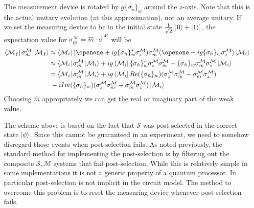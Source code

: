 \documentclass[aps,pra,12pt,onecolumn,showpacs,superscriptaddress,floatfix,footinbib,subfigure]{revtex4}
\def\bra#1{\mathinner{\langle{#1}|}}
\def\ket#1{\mathinner{|{#1}\rangle}}
\def\es{{\mathcal{S}}}
\def\md{{\mathcal{M}}}
\def\sm{{\es,\md}}
\def\sn{ \sigma_{ \hat{n} } }
\begin{document}
The measurement device is rotated by $g\{\sigma_{\hat{n}}\}_w$ around the $z$-axis.  Note that this is the actual unitary evolution (at this approximation), not an average unitary.  If we set the measuring device to be in the initial state $\frac{1}{\sqrt{2}}[\ket{0}+\ket{1}]$,  the  expectation value for $\sigma_{\hat{m}}^\md=\hat{m}\cdot\vec{\sigma}^\md$ will be
\begin{align}\label{readout}
\bra{\md_f}\sigma_{\hat{m}}^\md\ket{\md_f}&\approx\bra{\md_i}(\openone+ig\{\sn\}_w^*\sigma_z^\md)\sigma_{\hat{m}}^\md(\openone-ig\{\sn\}_w\sigma_z^\md)\ket{\md_i}\\&\approx\bra{\md_i}\sigma_{\hat{m}}^\md\ket{\md_i}+ig\bra{\md_i}\{\sn\}_w^*\sigma_z^\md\sigma_{\hat{m}}^\md-\{\sn\}_w\sigma_{\hat{m}}^\md\sigma_z^\md\ket{\md_i}\\
\label{ReIm}&=\bra{\md_i}\sigma_{\hat{m}}^\md\ket{\md_i}+ig\bra{\md_i}Re(\{\sn\}_w)(\sigma_z^\md\sigma_{\hat{m}}^\md-\sigma_{\hat{m}}^\md\sigma_z^\md)\\&\;-iIm(\{\sn\}_w)(\sigma_z^\md\sigma_{\hat{m}}^\md+\sigma_{\hat{m}}^\md\sigma_z^\md)\ket{\md_i}\nonumber
\end{align}
Choosing $\hat{m}$ appropriately we can get  the real or imaginary part of the weak value.

The scheme above is based on the fact that $\es$ was post-selected in the correct state $\ket{\phi}$. Since this cannot be guaranteed in an experiment, we need to somehow disregard those events when post-selection fails.  As noted previously, the standard method for implementing the post-selection is by filtering out the composite $\sm$ systems that fail post-selection. While this is relatively simple in some  implementations  it  is not a generic property of a quantum processor. In particular post-selection is not implicit in the circuit model. The method to overcome this problem  is to reset the measuring device whenever post-selection fails.
\end{document}
